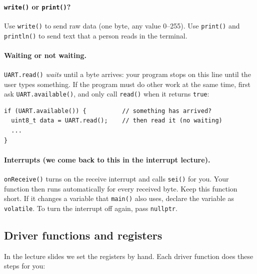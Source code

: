 \documentclass[11pt,a4paper]{article}
\newcommand{\code}[1]{\texttt{#1}}
\begin{document}
\paragraph{\code{write()} or \code{print()}?} Use \code{write()} to send raw
data (one byte, any value 0--255). Use \code{print()} and \code{println()} to
send text that a person reads in the terminal.

\paragraph{Waiting or not waiting.} \code{UART.read()} \emph{waits} until a byte
arrives: your program stops on this line until the user types something. If
the program must do other work at the same time, first ask
\code{UART.available()}, and only call \code{read()} when it returns \code{true}:
\begin{lstlisting}
if (UART.available()) {          // something has arrived?
  uint8_t data = UART.read();    // then read it (no waiting)
  ...
}
\end{lstlisting}

\paragraph{Interrupts (we come back to this in the interrupt lecture).}
\code{onReceive()} turns on the receive interrupt and calls \code{sei()} for
you. Your function then runs automatically for every received byte. Keep this
function short. If it changes a variable that \code{main()} also uses, declare
the variable as \code{volatile}. To turn the interrupt off again, pass
\code{nullptr}.

\subsection*{Driver functions and registers}

In the lecture slides we set the registers by hand. Each driver function does
these steps for you:
\end{document}
